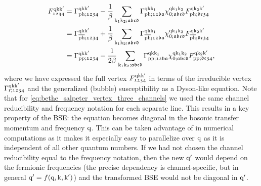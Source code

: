 \documentclass[../../main.tex]{subfiles}
\begin{document}
\begin{subequations}\label{eq:bethe_salpeter_vertex_three_channels}
\begin{align}
	F_{\mathfrak{1234}}^{\text{q}\text{k}\text{k}'}&=\Gamma_{\text{ph};\mathfrak{1234}}^{\text{q}\text{k}\text{k}'}-\frac1\beta\sum_{\text{k}_1\text{k}_2;\mathfrak{abcd}} \Gamma_{\text{ph};\mathfrak{12ba}}^{\text{q}\text{k}\text{k}_1} \chi_{0;\mathfrak{abcd}}^{\text{q}\text{k}_1\text{k}_2} F_{\text{ph};\mathfrak{dc34}}^{\text{q}\text{k}_2\text{k}'}\\
	&=\Gamma_{\overline{\text{ph}};\mathfrak{1234}}^{\text{q}\text{k}\text{k}'}+\frac1\beta\sum_{\text{k}_1\text{k}_2;\mathfrak{abcd}} \Gamma_{\overline{\text{ph}};\mathfrak{12ba}}^{\text{q}\text{k}\text{k}_1} \chi_{0;\mathfrak{abcd}}^{\text{q}\text{k}_1\text{k}_2} F_{\overline{\text{ph}};\mathfrak{dc34}}^{\text{q}\text{k}_2\text{k}'}\\
	&=\Gamma_{\text{pp};\mathfrak{1234}}^{\text{q}\text{k}\text{k}'}-\frac{1}{2\beta}\sum_{\text{k}_1\text{k}_2;\mathfrak{abcd}} \Gamma_{\text{pp};\mathfrak{12ba}}^{\text{q}\text{k}\text{k}_1} \chi_{0;\mathfrak{abcd}}^{\text{q}\text{k}_1\text{k}_2} F_{\text{pp};\mathfrak{dc34}}^{\text{q}\text{k}_2\text{k}'},
\end{align}
\end{subequations}
where we have expressed the full vertex $F_{\mathfrak{1234}}^{\text{q}\text{k}\text{k}'}$ in terms of the irreducible vertex $\Gamma_{\text{r};\mathfrak{1234}}^{\text{q}\text{k}\text{k}'}$ and the generalized (bubble) susceptibility as a Dyson-like equation. Note that for \eqref{eq:bethe_salpeter_vertex_three_channels} we used the same channel reducibility and frequency notation for each separate line. This results in a key property of the BSE: the equation becomes diagonal in the bosonic transfer momentum and frequency $\text{q}$. This can be taken advantage of in numerical computations as it makes it especially easy to parallelize over $\text{q}$ as it is independent of all other quantum numbers. If we had not chosen the channel reducibility equal to the frequency notation, then the new $\text{q}'$ would depend on the fermionic frequencies (the precise dependency is channel-specific, but in general $\text{q}'=f(\text{q},\text{k},\text{k}')$) and the transformed BSE would not be diagonal in $\text{q}'$. 
\end{document}
